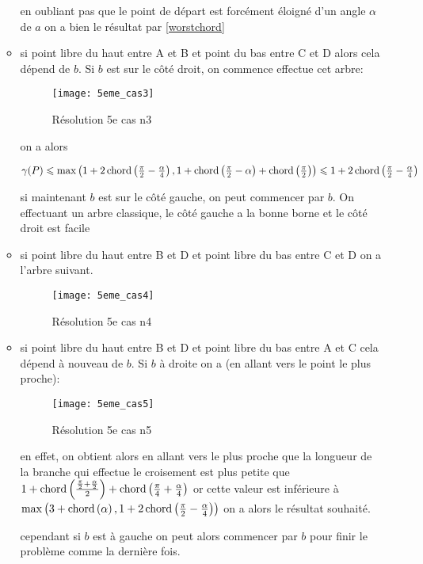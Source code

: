 \begin{itemize}
\begin{itemize}
en oubliant pas que le point de départ est forcément éloigné d'un angle $\alpha$ de $a$ on a bien le résultat par \ref{worstchord}

\item \label{5cas22} si point libre du haut entre A et B et point du bas entre C et D alors cela dépend de $b$. Si $b$ est sur le côté droit, on commence effectue cet arbre:

\begin{figure}[h!]
  \centering
  \texttt{[image: 5eme\_cas3]}
  \caption{Résolution 5e cas n3}
  \label{fig:5eme_cas3}
\end{figure}

on a alors

$\gamma(P) \leqslant \max\left(1+2\operatorname{chord}\left(\frac{\pi}{2} - \frac{\alpha}{4}\right), 1 + \operatorname{chord}\left(\frac{\pi}{2} - \alpha\right) + \operatorname{chord}\left(\frac{\pi}{2}\right)\right) \leqslant 1+2\operatorname{chord}\left(\frac{\pi}{2} - \frac{\alpha}{4}\right)$

si maintenant $b$ est sur le côté gauche, on peut commencer par $b$. On effectuant un arbre classique, le côté gauche a la bonne borne et le côté droit est facile

\item \label{5cas23} si point libre du haut entre B et D et point libre du bas entre C et D on a l'arbre suivant.

\begin{figure}[h!]
  \centering
  \texttt{[image: 5eme\_cas4]}
  \caption{Résolution 5e cas n4}
  \label{fig:5eme_cas4}
\end{figure}

\item \label{5cas24} si point libre du haut entre B et D et point libre du bas entre A et C cela dépend à nouveau de $b$. Si $b$ à droite on a (en allant vers le point le plus proche):

\begin{figure}[h!]
  \centering
  \texttt{[image: 5eme\_cas5]}
  \caption{Résolution 5e cas n5}
  \label{fig:5eme_cas5}
\end{figure}

en effet, on obtient alors en allant vers le plus proche que la longueur de la branche qui effectue le croisement est plus petite que $1+\operatorname{chord}\left(\frac{\frac{\pi}{2} + \frac{\alpha}{2}}{2}\right) + \operatorname{chord}\left(\frac{\pi}{4} + \frac{\alpha}{4}\right)$ or cette valeur est inférieure à $\max\left(3 + \operatorname{chord}\left(\alpha\right), 1 + 2\operatorname{chord}\left(\frac{\pi}{2} - \frac{\alpha}{4}\right)\right)$ on a alors le résultat souhaité.

cependant si $b$ est à gauche on peut alors commencer par $b$ pour finir le problème comme la dernière fois.

\end{itemize}
\end{itemize}

